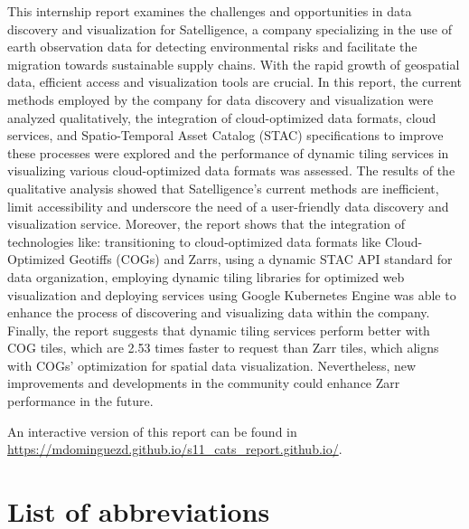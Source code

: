 \documentclass[
  oneside,
  open=any]{scrbook}
\begin{document}
This internship report examines the challenges and opportunities in data
discovery and visualization for Satelligence, a company specializing in
the use of earth observation data for detecting environmental risks and
facilitate the migration towards sustainable supply chains. With the
rapid growth of geospatial data, efficient access and visualization
tools are crucial. In this report, the current methods employed by the
company for data discovery and visualization were analyzed
qualitatively, the integration of cloud-optimized data formats, cloud
services, and Spatio-Temporal Asset Catalog (STAC) specifications to
improve these processes were explored and the performance of dynamic
tiling services in visualizing various cloud-optimized data formats was
assessed. The results of the qualitative analysis showed that
Satelligence's current methods are inefficient, limit accessibility and
underscore the need of a user-friendly data discovery and visualization
service. Moreover, the report shows that the integration of technologies
like: transitioning to cloud-optimized data formats like Cloud-Optimized
Geotiffs (COGs) and Zarrs, using a dynamic STAC API standard for data
organization, employing dynamic tiling libraries for optimized web
visualization and deploying services using Google Kubernetes Engine was
able to enhance the process of discovering and visualizing data within
the company. Finally, the report suggests that dynamic tiling services
perform better with COG tiles, which are 2.53 times faster to request
than Zarr tiles, which aligns with COGs' optimization for spatial data
visualization. Nevertheless, new improvements and developments in the
community could enhance Zarr performance in the future.

\vspace*{\fill}

An interactive version of this report can be found in
\url{https://mdominguezd.github.io/s11_cats_report.github.io/}.

\newpage

\chapter*{List of abbreviations}\label{list-of-abbreviations}
\end{document}
